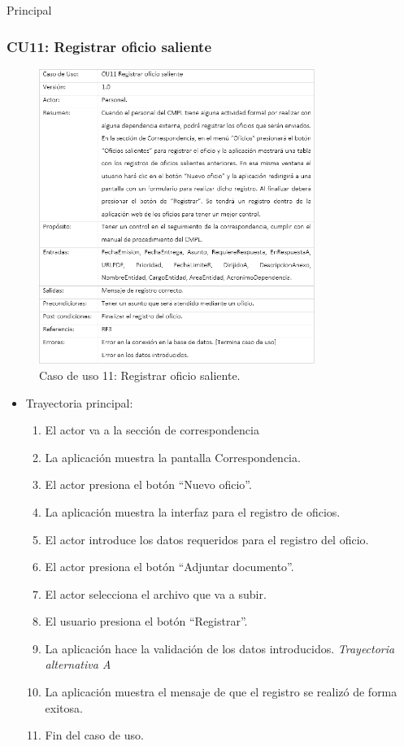 \begin{UCtrayectoria}{Principal}
		\subsubsection{CU11: Registrar oficio saliente}
\begin{figure}[htbp!]
		\centering
			\includegraphics[width=0.8\textwidth]{images/CU/CU11}
		\caption{Caso de uso 11: Registrar oficio saliente.}
		\label{Tabla}
	\end{figure}

\begin{itemize}
	\item Trayectoria principal:
	\begin{enumerate}
		\item El actor va a la sección de correspondencia 
		\item La aplicación muestra la pantalla  Correspondencia.
		\item El actor presiona el botón “Nuevo oficio”.
		\item La aplicación muestra la interfaz  para el registro de oficios.
		\item El actor introduce los datos requeridos para el registro del oficio.
		\item El actor presiona el botón “Adjuntar documento”.
		\item El actor selecciona el archivo que va a subir.
		\item El usuario presiona el botón “Registrar”. 
		\item La aplicación hace la validación de los datos introducidos. \textsl{Trayectoria alternativa A} 
		\item La aplicación muestra el mensaje  de que el registro se realizó de forma exitosa.
		\item Fin del caso de uso.
	\end{enumerate}
	

\end{itemize}
\end{UCtrayectoria}
